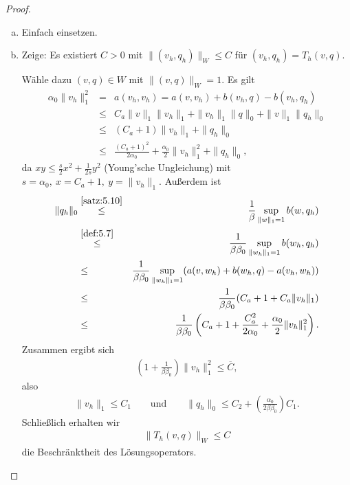 \begin{proof}
    \begin{enumerate}[a)]
      \item
        Einfach einsetzen.
      \item
        Zeige: Es existiert $C > 0$ mit $\|(v_h, q_h)\|_W \le C$ für
        $(v_h, q_h) = T_h(v, q)$.

        Wähle dazu $(v, q)\in W$ mit $\|(v, q)\|_W = 1$.
        Es gilt
        \begin{eqnarray*}
                \alpha_0 \|v_h\|_1^2
            &=& a(v_h, v_h)
             =  a(v, v_h) + b(v_h, q) - b(v_h, q_h) \\
            &\le& C_a \|v\|_1 \|v_h\|_1 + \|v_h\|_1 \|q\|_0 + \|v\|_1 \|q_h\|_0
                  \\
            &\le& (C_a + 1) \|v_h\|_1 + \|q_h\|_0 \\
            &\le& \frac{(C_a + 1)^2}{2 \alpha_0} + \frac{\alpha_0}{2}
                  \|v_h\|_1^2 + \|q_h\|_0,
        \end{eqnarray*}
        da $x y \le \frac{s}{2} x^2 + \frac{1}{2 s} y^2$
        (Young'sche Ungleichung) mit $s = \alpha_0, \ x = C_a +1, \
        y = \|v_h\|_1$.
        Au\ss{}erdem ist
        \begin{eqnarray*}
                  \|q_h\|_0
            &\stackrel{\eqref{satz:5.10}}{\le}&
                  \frac{1}{\beta} \sup_{\|w\|_1 = 1} b(w, q_h) \\
            &\stackrel{\eqref{def:5.7}}{\le}&
                  \frac{1}{\beta \beta_0} \sup_{\|w_h\|_1 = 1} b(w_h, q_h) \\
            &\le& \frac{1}{\beta \beta_0} \sup_{\|w_h\|_1 = 1}(a(v, w_h) +
                  b(w_h, q) - a(v_h, w_h)) \\
            &\le& \frac{1}{\beta \beta_0} (C_a + 1 + C_a \|v_h\|_1) \\
            &\le& \frac{1}{\beta \beta_0} \left(C_a + 1 +
                  \frac{C_a^2}{2 \alpha_0} +
                  \frac{\alpha_0}{2} \|v_h\|_1^2\right).
        \end{eqnarray*}
        Zusammen ergibt sich
        \begin{eqnarray*}
            \left(1 + \frac{1}{\beta \beta_0}\right) \|v_h\|_1^2 \le \overline C,
        \end{eqnarray*}
        also
        \begin{eqnarray*}
            \|v_h\|_1 \le C_1
            \qquad \text{und} \qquad
            \|q_h\|_0 \le C_2 + \left(\frac{\alpha_0}{2 \beta \beta_0}\right)
            C_1.
        \end{eqnarray*}
        Schlie\ss{}lich erhalten wir
        \begin{eqnarray*}
            \|T_h(v, q)\|_W \le C
        \end{eqnarray*}
        die Beschränktheit des Lösungsoperators.
    \end{enumerate}
\end{proof}


